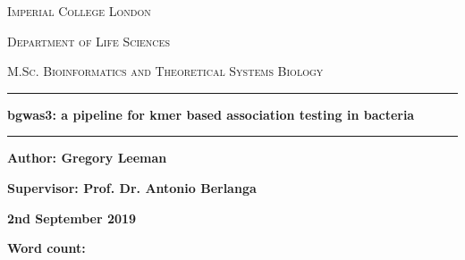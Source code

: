 \begin{titlepage}
\begin{center}

\vspace*{1cm}

\textsc{\large{Imperial College London}}

\textsc{\large{Department of Life Sciences}}

\textsc{\large{M.Sc. Bioinformatics and Theoretical Systems Biology}}

\vspace*{3cm}

\par\noindent\rule{\textwidth}{0.4pt}

\textbf{\Huge{bgwas3: a pipeline for kmer based association testing in bacteria}}
\par\noindent\rule{\textwidth}{0.4pt}

\vspace*{3cm}

\textbf{\Large{Author: Gregory Leeman}}

\textbf{\Large{Supervisor: Prof. Dr. Antonio Berlanga}}

\vfill

\textbf{\large{2nd September 2019}}

\textbf{\large{Word count:}}

\vspace{0.8cm}

\end{center}
\end{titlepage}
